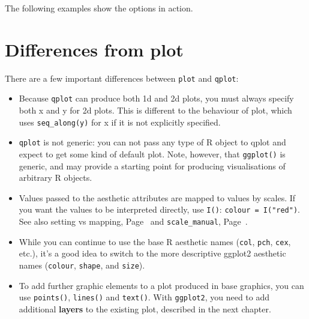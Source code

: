 The following examples show the options in action.

% 


\section{Differences from plot}
\label{sec:plot_diffs}

There are a few important differences between {\tt plot} and {\tt qplot}:

\begin{itemize}
  \item Because {\tt qplot} can produce both 1d and 2d plots, you must always specify both x and y for 2d plots.  This is different to the behaviour of plot, which uses {\tt seq\_along(y)} for x if it is not explicitly specified.
  
  \item {\tt qplot} is not generic: you can not pass any type of R object to qplot and expect to get some kind of default plot.  Note, however, that {\tt ggplot()} is generic, and may provide a starting point for producing visualisations of arbitrary R objects.
  
  \item Values passed to the aesthetic attributes are mapped to values by scales.  If you want the values to be interpreted directly, use {\tt I()}: {\tt colour = I("red")}.  See also setting vs mapping, Page~\pageref{sub:setting-mapping} and {\tt scale\_manual}, Page~\pageref{sub:scale-discrete}.        %
  
  \item While you can continue to use the base R aesthetic names ({\tt col},  {\tt pch}, {\tt cex}, etc.), it's a good idea to switch to the more descriptive ggplot2 aesthetic names ({\tt colour}, {\tt shape}, and {\tt size}).


  \item To add further graphic elements to a plot produced in base graphics, you can use {\tt points()}, {\tt lines()} and {\tt text()}.  With {\tt ggplot2}, you need to add additional {\bf layers} to the existing plot, described in the next chapter.
  
\end{itemize}


